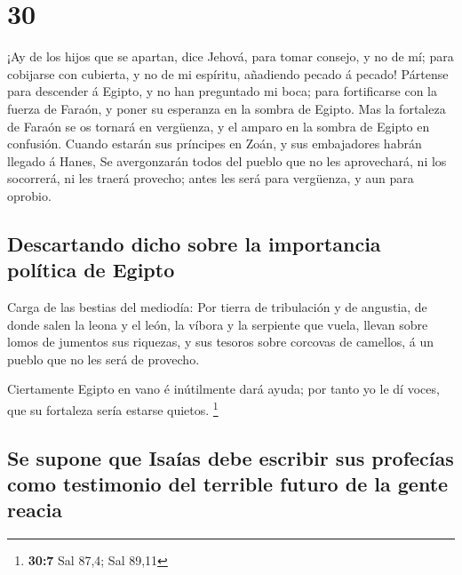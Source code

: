 \hypertarget{section-29}{%
\section{30}\label{section-29}}

 ¡Ay de los hijos que se apartan, dice Jehová, para tomar
consejo, y no de mí; para cobijarse con cubierta, y no de mi espíritu,
añadiendo pecado á pecado!  Pártense para descender á
Egipto, y no han preguntado mi boca; para fortificarse con la fuerza de
Faraón, y poner su esperanza en la sombra de Egipto.  Mas la
fortaleza de Faraón se os tornará en vergüenza, y el amparo en la sombra
de Egipto en confusión.  Cuando estarán sus príncipes en
Zoán, y sus embajadores habrán llegado á Hanes,  Se
avergonzarán todos del pueblo que no les aprovechará, ni los socorrerá,
ni les traerá provecho; antes les será para vergüenza, y aun para
oprobio.

\hypertarget{descartando-dicho-sobre-la-importancia-poluxedtica-de-egipto}{%
\subsection{Descartando dicho sobre la importancia política de
Egipto}\label{descartando-dicho-sobre-la-importancia-poluxedtica-de-egipto}}

 Carga de las bestias del mediodía: Por tierra de
tribulación y de angustia, de donde salen la leona y el león, la víbora
y la serpiente que vuela, llevan sobre lomos de jumentos sus riquezas, y
sus tesoros sobre corcovas de camellos, á un pueblo que no les será de
provecho.

 Ciertamente Egipto en vano é inútilmente dará ayuda; por
tanto yo le dí voces, que su fortaleza sería estarse quietos.
\footnote{\textbf{30:7} Sal 87,4; Sal 89,11}

\hypertarget{se-supone-que-isauxedas-debe-escribir-sus-profecuxedas-como-testimonio-del-terrible-futuro-de-la-gente-reacia}{%
\subsection{Se supone que Isaías debe escribir sus profecías como
testimonio del terrible futuro de la gente
reacia}\label{se-supone-que-isauxedas-debe-escribir-sus-profecuxedas-como-testimonio-del-terrible-futuro-de-la-gente-reacia}}

